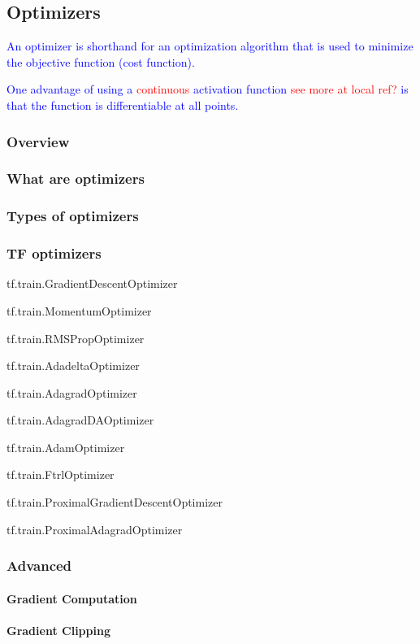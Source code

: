 \subsection{Optimizers}

\textcolor{blue}{An optimizer is shorthand for an optimization algorithm that is used to minimize the objective function (cost function).}
	
\textcolor{blue}{One advantage of using a \textcolor{red}{continuous} activation function \textcolor{red}{see more at local ref?} is that the function is differentiable at all points. }

\subsubsection{Overview}

\subsubsection{What are optimizers}

\subsubsection{Types of optimizers}

\subsubsection{TF optimizers}

tf.train.GradientDescentOptimizer

tf.train.MomentumOptimizer

tf.train.RMSPropOptimizer

tf.train.AdadeltaOptimizer

tf.train.AdagradOptimizer

tf.train.AdagradDAOptimizer

tf.train.AdamOptimizer

tf.train.FtrlOptimizer

tf.train.ProximalGradientDescentOptimizer

tf.train.ProximalAdagradOptimizer

\subsubsection{Advanced}

\paragraph{Gradient Computation}

\paragraph{Gradient Clipping}